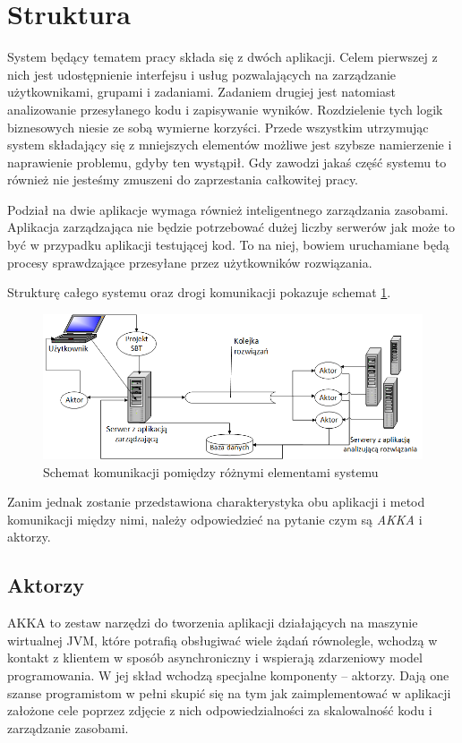 \documentclass[brudnopis]{xmgr}
\begin{document}
\section{Struktura}
\label{section:struktrura}
System będący tematem pracy składa się z dwóch aplikacji. Celem pierwszej z nich jest udostępnienie interfejsu i usług pozwalających na zarządzanie użytkownikami, grupami i zadaniami.
Zadaniem drugiej jest natomiast analizowanie przesyłanego kodu i zapisywanie wyników. Rozdzielenie tych logik biznesowych niesie ze sobą wymierne korzyści. Przede wszystkim utrzymując system składający się z mniejszych elementów możliwe jest szybsze namierzenie i naprawienie problemu, gdyby ten wystąpił. Gdy zawodzi jakaś część systemu to również nie jesteśmy zmuszeni do zaprzestania całkowitej pracy. 

Podział na dwie aplikacje wymaga również inteligentnego zarządzania zasobami. Aplikacja zarządzająca nie będzie potrzebować dużej liczby serwerów jak może to być w przypadku aplikacji testującej kod. To na niej, bowiem uruchamiane będą procesy sprawdzające przesyłane przez użytkowników rozwiązania.

Strukturę całego systemu oraz drogi komunikacji pokazuje schemat \ref{system:schemat}. 

\begin{figure}[!tbh]
\centering 
\includegraphics[width=1.05\hsize]{fig/scaxerciser_schemat}
\caption{Schemat komunikacji pomiędzy różnymi elementami systemu\label{system:schemat}}
\end{figure}

Zanim jednak zostanie przedstawiona charakterystyka obu aplikacji i metod komunikacji między nimi, należy odpowiedzieć na pytanie czym są \emph{AKKA} i aktorzy.

\subsection{Aktorzy}

AKKA to zestaw narzędzi do tworzenia aplikacji działających na maszynie wirtualnej JVM, które potrafią obsługiwać wiele żądań równolegle, wchodzą w kontakt z klientem w sposób asynchroniczny i wspierają zdarzeniowy model programowania. W jej skład wchodzą specjalne komponenty -- aktorzy. Dają one szanse programistom w pełni skupić się na tym jak zaimplementować w aplikacji założone cele poprzez zdjęcie z nich odpowiedzialności za skalowalność kodu i zarządzanie zasobami.   
\end{document}
